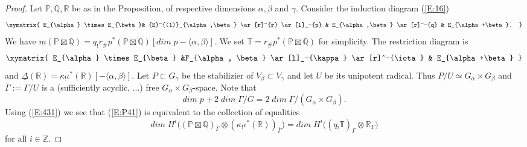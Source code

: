 \documentclass[a4paper,10pt]{amsart}
\def\Z{\mathbb{Z}}
\def\a{\alpha}
\numberwithin{equation}{section}
\begin{document}
\begin{proof}
Let $\mathbb{P}, \mathbb{Q}, \mathbb{R}$ be as in the Proposition, of respective dimensions $\a, \beta$ and $\gamma$. Consider the induction diagram (\ref{E:16})
\begin{equation*}
\xymatrix{ E_{\alpha} \times  E_{\beta}&  {E}^{(1)}_{\alpha,\beta} \ar[r]^{r} \ar[l]_-{p} & E_{\alpha,\beta} \ar[r]^-{q} &
E_{\alpha+\beta}.
}
\end{equation*}
We have $\underline{m}(\mathbb{P} \boxtimes \mathbb{Q})= q_! r_{\#} p^*(\mathbb{P} \boxtimes \mathbb{Q})[dim\;p-\langle \alpha, \beta \rangle]$. We set $\mathbb{T}=r_{\#} p^*(\mathbb{P} \boxtimes \mathbb{Q})$ for simplicity. The restriction diagram is 
\begin{equation*}
\xymatrix{ 
E_{\alpha} \times E_{\beta} &F_{\alpha, \beta} \ar[l]_-{\kappa} \ar[r]^-{\iota} &
E_{\alpha+\beta}
}
\end{equation*}
and $\underline{\Delta}(\mathbb{R})=\kappa_!\iota^*(\mathbb{R})[-\langle \alpha, \beta\rangle]$. Let $P \subset G_{\gamma}$ be the stabilizier of $V_{\beta} \subset V_{\gamma}$ and let $U$ be its unipotent radical. Thus $P/U \simeq G_{\a} \times G_{\beta}$ and $\overline{\Gamma}:=\Gamma/U$ is a (sufficiently acyclic, ...) free $G_{\a} \times G_{\beta}$-space. Note that
\begin{equation}\label{E:431}
dim\;p + 2\;dim\;\Gamma/G = 2 \;dim\;\overline{\Gamma}/(G_{\a} \times G_{\beta}).
\end{equation}
Using (\ref{E:431}) we see that (\ref{E:P41}) is equivalent to the collection of equalities
\begin{equation}\label{E:P42}
dim\;H^i\big( (\mathbb{P} \boxtimes \mathbb{Q})_{\overline{\Gamma}} \otimes (\kappa_{!} \iota^* (\mathbb{R}))_{\overline{\Gamma}}\big)=dim\;H^i\big( (q_! \mathbb{T})_{\Gamma} \otimes \mathbb{R}_{\Gamma} \big)
\end{equation}
for all $i \in \Z$.

\vspace{.1in}


\end{proof}
\end{document}
